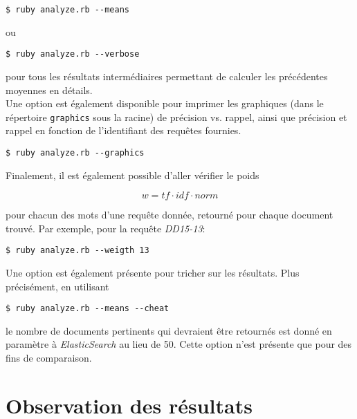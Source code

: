 \documentclass[12pt]{article}
\begin{document}
\begin{verbatim}
$ ruby analyze.rb --means
\end{verbatim}

ou

\begin{verbatim}
$ ruby analyze.rb --verbose
\end{verbatim}

pour tous les résultats intermédiaires permettant de calculer les précédentes moyennes en détails.\\

Une option est également disponible pour imprimer les graphiques (dans le répertoire \verb;graphics; sous la racine) de précision vs. rappel, ainsi que précision et rappel en fonction de l'identifiant des requêtes fournies.

\begin{verbatim}
$ ruby analyze.rb --graphics
\end{verbatim}

Finalement, il est également possible d'aller vérifier le poids

$$
w = tf \cdot idf \cdot norm
$$

pour chacun des mots d'une requête donnée, retourné pour chaque document trouvé. Par exemple, pour la requête \textit{DD15-13}:

\begin{verbatim}
$ ruby analyze.rb --weigth 13
\end{verbatim}

Une option est également présente pour tricher sur les résultats. Plus précisément, en utilisant 

\begin{verbatim}
$ ruby analyze.rb --means --cheat
\end{verbatim}

le nombre de documents pertinents qui devraient être retournés est donné en paramètre à \textit{ElasticSearch} au lieu de 50. Cette option n'est présente que pour des fins de comparaison.

\section{Observation des résultats}
\end{document}
